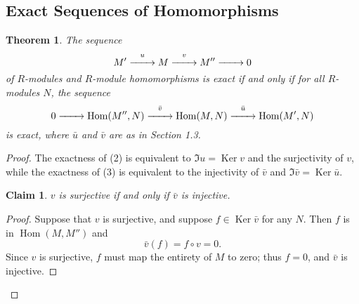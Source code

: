 \documentclass[11pt]{article}
\newtheorem{theorem}{Theorem}
\newtheorem{claim}{Claim}
\newcommand{\Hom}{\operatorname{Hom}}
\newcommand{\Ker}{\operatorname{Ker}}
\renewcommand{\longrightarrow}{\xrightarrow{\hspace*{0.7cm}}}
\begin{document}
\subsection{Exact Sequences of Homomorphisms}

\begin{adjustwidth}{0.5cm}{}
	\begin{theorem}
		The sequence
		\begin{equation}
			M' \stackrel{u}{\longrightarrow} M \stackrel{v}{\longrightarrow} M'' \longrightarrow 0
		\end{equation}
		of $R$-modules and $R$-module homomorphisms is exact if and only if for all $R$-modules $N$, the sequence
		\begin{equation}
			0 \longrightarrow \Hom(M'', N) \stackrel{\bar{v}}{\longrightarrow} \Hom(M, N) \stackrel{\bar{u}}{\longrightarrow} \Hom(M', N)
		\end{equation}
		is exact, where $\bar{u}$ and $\bar{v}$ are as in Section 1.3.
	\end{theorem}
	\newpage
	\begin{proof}
		The exactness of (2) is equivalent to $\Im u = \Ker v$ and the surjectivity of $v$, while the exactness of (3) is equivalent to the injectivity of $\bar{v}$ and $\Im \bar{v} = \Ker \bar{u}$.
		\begin{adjustwidth}{0.5cm}{}
			\begin{claim}
				$v$ is surjective if and only if $\bar{v}$ is injective.
			\end{claim}
			\begin{proof}\renewcommand{\qedsymbol}{}
				Suppose that $v$ is surjective, and suppose $f \in \Ker \bar{v}$ for any $N$. Then $f$ is in $\Hom(M, M'')$ and
				\[
					\bar{v}(f) = f \circ v = 0.
				\]
				Since $v$ is surjective, $f$ must map the entirety of $M$ to zero; thus $f = 0$, and $\bar{v}$ is injective.


\end{proof}
\end{adjustwidth}
\end{proof}
\end{adjustwidth}
\end{document}

